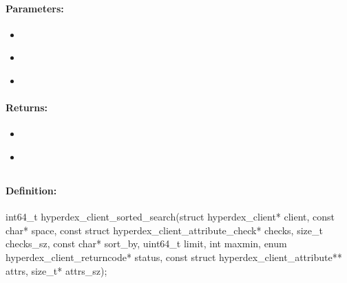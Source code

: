 \paragraph{Parameters:}
\begin{itemize}[noitemsep]
\item {}\\

\item {}\\

\item {}\\

\end{itemize}

\paragraph{Returns:}
\begin{itemize}[noitemsep]
\item {}\\

\item {}\\

\end{itemize}

\pagebreak
\subsection{}
\label{api:c:sorted_search}


\paragraph{Definition:}
\begin{ccode}
int64_t hyperdex_client_sorted_search(struct hyperdex_client* client,
        const char* space,
        const struct hyperdex_client_attribute_check* checks, size_t checks_sz,
        const char* sort_by,
        uint64_t limit,
        int maxmin,
        enum hyperdex_client_returncode* status,
        const struct hyperdex_client_attribute** attrs, size_t* attrs_sz);
\end{ccode}

